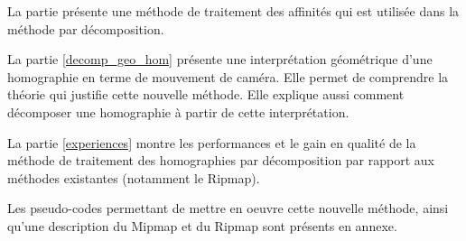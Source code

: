 	La partie \label{szeliski_section} présente une méthode de traitement des affinités qui est utilisée dans la méthode par décomposition.

	La partie \ref{decomp_geo_hom} présente une interprétation géométrique d'une homographie en terme de mouvement de caméra. Elle permet de comprendre la théorie qui justifie cette nouvelle méthode. Elle explique aussi comment décomposer une homographie à partir de cette interprétation.

	La partie \ref{experiences} montre les performances et le gain en qualité de la méthode de traitement des homographies par décomposition par rapport aux méthodes existantes (notamment le Ripmap).

	Les pseudo-codes permettant de mettre en oeuvre cette nouvelle méthode, ainsi qu'une description du Mipmap et du Ripmap sont présents en annexe.
